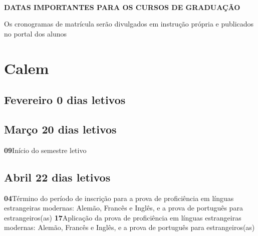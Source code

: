 \documentclass[thesis]{hmcposter}
\begin{document}
\begin{poster}
\vfill
\null
\columnbreak
~
\vfill
\begin{center}
\large \textbf{DATAS IMPORTANTES PARA OS CURSOS DE GRADUAÇÃO}
\newline
\null
\newline
\begin{table}
\centering
{}
\end{table}
\newline
\null
\newline
Os cronogramas de matrícula serão divulgados em instrução própria e publicados no portal dos alunos
\end{center}
\vfill
\null
\newpage\section{\color{hmcorange}Calem}\subsection{Fevereiro \hfill 0 dias letivos}\subsection{Março \hfill 20 dias letivos}\textbf{09}\qquad Início do semestre letivo \newline \null\subsection{Abril \hfill 22 dias letivos}\textbf{04}\qquad Término do período de inscrição para a prova de proficiência em línguas estrangeiras modernas: Alemão, Francês e Inglês, e a prova de português para estrangeiros(as) \newline \null\textbf{17}\qquad Aplicação da prova de proficiência em línguas estrangeiras modernas: Alemão, Francês e Inglês, e a prova de português para estrangeiros(as) \newline \null\vfill\null
\columnbreak

\end{poster}
\end{document}
